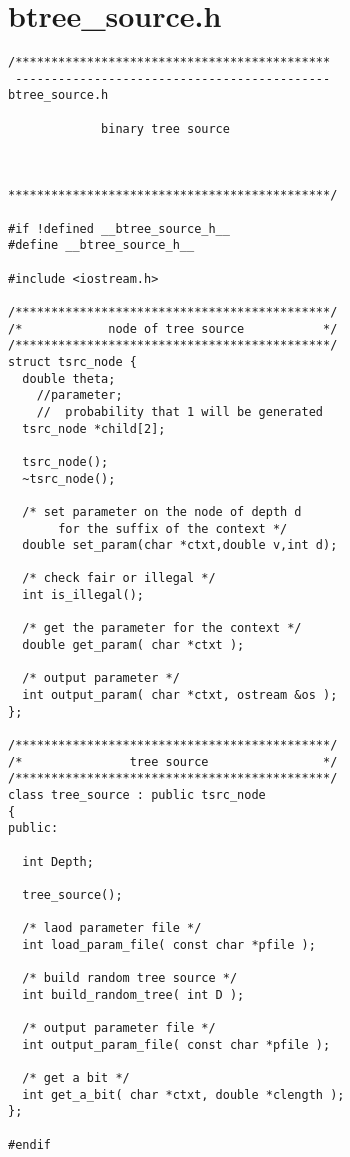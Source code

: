 \section{btree\_source.h}
\begin{verbatim}
/********************************************
 --------------------------------------------
btree_source.h

             binary tree source



*********************************************/

#if !defined __btree_source_h__
#define __btree_source_h__

#include <iostream.h>

/********************************************/
/*            node of tree source           */
/********************************************/
struct tsrc_node {
  double theta;
    //parameter;
    //  probability that 1 will be generated
  tsrc_node *child[2];

  tsrc_node();
  ~tsrc_node();

  /* set parameter on the node of depth d
       for the suffix of the context */
  double set_param(char *ctxt,double v,int d);

  /* check fair or illegal */
  int is_illegal();

  /* get the parameter for the context */
  double get_param( char *ctxt );

  /* output parameter */
  int output_param( char *ctxt, ostream &os );
};

/********************************************/
/*               tree source                */
/********************************************/
class tree_source : public tsrc_node
{
public:

  int Depth;

  tree_source();

  /* laod parameter file */
  int load_param_file( const char *pfile );

  /* build random tree source */
  int build_random_tree( int D );

  /* output parameter file */
  int output_param_file( const char *pfile );

  /* get a bit */
  int get_a_bit( char *ctxt, double *clength );
};

#endif
\end{verbatim}
